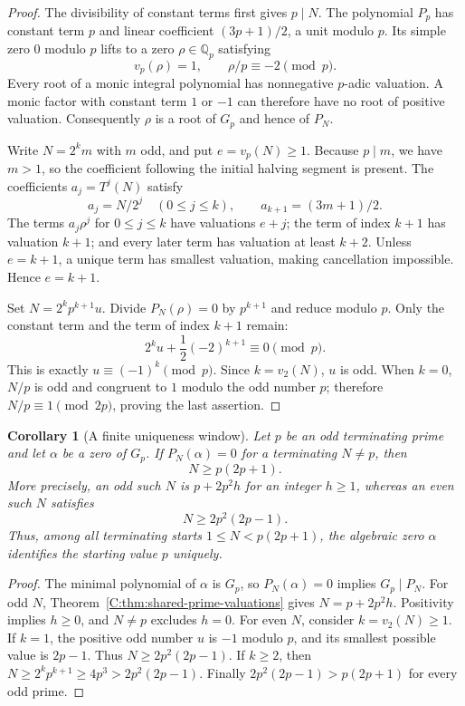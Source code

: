 \documentclass[11pt,a4paper]{article}
\newtheorem{corollary}[theorem]{Corollary}
\theoremstyle{definition}
\theoremstyle{remark}
\numberwithin{equation}{section}
\begin{document}
\begin{proof}
The divisibility of constant terms first gives $p\mid N$.
The polynomial $P_p$ has constant term $p$ and linear coefficient
$(3p+1)/2$, a unit modulo $p$. Its simple zero $0$ modulo $p$ lifts to
a zero $\rho\in\mathbb Q_p$ satisfying
\[
 v_p(\rho)=1,\qquad \rho/p\equiv-2\pmod p.
\]
Every root of a monic integral polynomial has nonnegative $p$-adic
valuation. A monic factor with constant term $1$ or $-1$ can therefore
have no root of positive valuation. Consequently $\rho$ is a root of
$G_p$ and hence of $P_N$.

Write $N=2^k m$ with $m$ odd, and put $e=v_p(N)\geq1$.
Because $p\mid m$, we have $m>1$, so the coefficient following the initial
halving segment is present. The coefficients $a_j=T^j(N)$ satisfy
\[
 a_j=N/2^j\quad(0\leq j\leq k),\qquad
 a_{k+1}=(3m+1)/2.
\]
The terms $a_j\rho^j$ for $0\leq j\leq k$ have valuations $e+j$;
the term of index $k+1$ has valuation $k+1$; and every later term has
valuation at least $k+2$. Unless $e=k+1$, a unique term has smallest
valuation, making cancellation impossible. Hence $e=k+1$.

Set $N=2^k p^{k+1}u$. Divide $P_N(\rho)=0$ by $p^{k+1}$ and reduce
modulo $p$. Only the constant term and the term of index $k+1$ remain:
\[
 2^k u+\frac12(-2)^{k+1}\equiv0\pmod p.
\]
This is exactly $u\equiv(-1)^k\pmod p$. Since $k=v_2(N)$, $u$ is odd.
When $k=0$, $N/p$ is odd and congruent to $1$ modulo the odd number $p$;
therefore $N/p\equiv1\pmod{2p}$, proving the last assertion.
\end{proof}

\begin{corollary}[A finite uniqueness window]
\label{C:cor:prime-zero-window}
Let $p$ be an odd terminating prime and let $\alpha$ be a zero of $G_p$.
If $P_N(\alpha)=0$ for a terminating $N\ne p$, then
\[
 N\geq p(2p+1).
\]
More precisely, an odd such $N$ is $p+2p^2h$ for an integer $h\geq1$,
whereas an even such $N$ satisfies
\[
 N\geq2p^2(2p-1).
\]
Thus, among all terminating starts $1\leq N<p(2p+1)$, the algebraic zero
$\alpha$ identifies the starting value $p$ uniquely.
\end{corollary}

\begin{proof}
The minimal polynomial of $\alpha$ is $G_p$, so $P_N(\alpha)=0$ implies
$G_p\mid P_N$. For odd $N$, Theorem~\ref{C:thm:shared-prime-valuations}
gives $N=p+2p^2h$. Positivity implies $h\geq0$, and $N\ne p$ excludes
$h=0$.
For even $N$, consider $k=v_2(N)\geq1$. If $k=1$, the positive odd number
$u$ is $-1$ modulo $p$, and its smallest possible value is $2p-1$.
Thus $N\geq2p^2(2p-1)$. If $k\geq2$, then
$N\geq2^k p^{k+1}\geq4p^3>2p^2(2p-1)$.
Finally $2p^2(2p-1)>p(2p+1)$ for every odd prime.
\end{proof}
\end{document}
